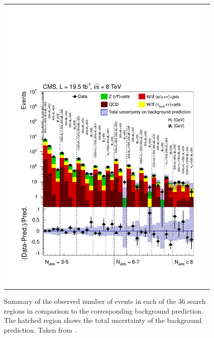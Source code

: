 \begin{figure}[!h]
  \centering
  \begin{tabular}{c}
    \includegraphics[width=0.99\textwidth]{figures/RA2_summary.pdf}
  \end{tabular}
  \caption{Summary of the observed number of events in each of the 36 search regions in comparison to the corresponding background prediction. The hatched region shows the total uncertainty of the background prediction. Taken from~\cite{Chatrchyan:2014lfa}.}
  \label{fig:ra2_summary}
\end{figure}

